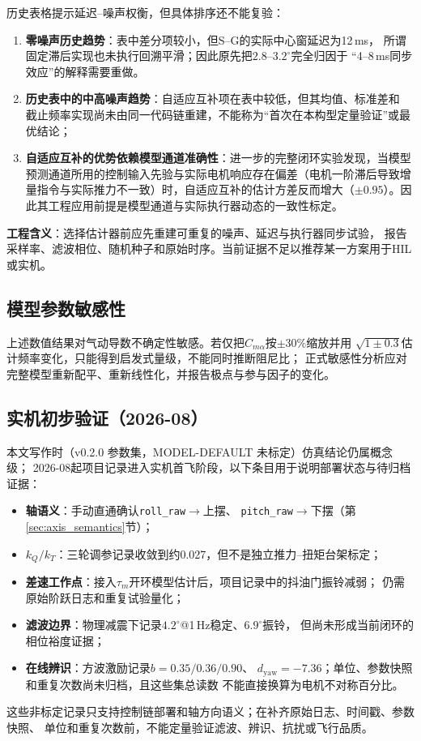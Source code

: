 历史表格提示延迟--噪声权衡，但具体排序还不能复验：

\begin{enumerate}[label=(\arabic*)]
    \item \textbf{零噪声历史趋势}：表中差分项较小，但S--G的实际中心窗延迟为12\,ms，
          所谓固定滞后实现也未执行回溯平滑；因此原先把$2.8$--$3.2^\circ$完全归因于
          “4--8\,ms同步效应”的解释需要重做。
    \item \textbf{历史表中的中高噪声趋势}：自适应互补项在表中较低，但其均值、标准差和
          截止频率实现尚未由同一代码链重建，不能称为“首次在本构型定量验证”或最优结论；
    \item \textbf{自适应互补的优势依赖模型通道准确性}：进一步的完整闭环实验发现，当模型预测通道所用的控制输入先验与实际电机响应存在偏差（电机一阶滞后导致增量指令与实际推力不一致）时，自适应互补的估计方差反而增大（$\pm 0.95$）。因此其工程应用前提是模型通道与实际执行器动态的一致性标定。
\end{enumerate}

\textbf{工程含义}：选择估计器前应先重建可重复的噪声、延迟与执行器同步试验，
报告采样率、滤波相位、随机种子和原始时序。当前证据不足以推荐某一方案用于HIL或实机。

\subsection{模型参数敏感性}

上述数值结果对气动导数不确定性敏感。若仅把$C_{m\alpha}$按$\pm30\%$缩放并用
$\sqrt{1\pm0.3}$估计频率变化，只能得到启发式量级，不能同时推断阻尼比；
正式敏感性分析应对完整模型重新配平、重新线性化，并报告极点与参与因子的变化。

\subsection{实机初步验证（2026-08）}
本文写作时（v0.2.0 参数集，MODEL-DEFAULT 未标定）仿真结论仍属概念级；
2026-08起项目记录进入实机首飞阶段，以下条目用于说明部署状态与待归档证据：
\begin{itemize}
    \item \textbf{轴语义}：手动直通确认\texttt{roll\_raw}$\to$上摆、
          \texttt{pitch\_raw}$\to$下摆（第\ref{sec:axis_semantics}节）；
    \item \textbf{$k_Q/k_T$}：三轮调参记录收敛到约0.027，但不是独立推力--扭矩台架标定；
    \item \textbf{差速工作点}：接入$\tau_m$开环模型估计后，项目记录中的抖油门振铃减弱；
          仍需原始阶跃日志和重复试验量化；
    \item \textbf{滤波边界}：物理减震下记录$4.2^\circ$@1\,Hz稳定、$6.9^\circ$振铃，
          但尚未形成当前闭环的相位裕度证据；
    \item \textbf{在线辨识}：方波激励记录$b=0.35/0.36/0.90$、
          $d_{\text{yaw}}=-7.36$；单位、参数快照和重复次数尚未归档，且这些集总读数
          不能直接换算为电机不对称百分比。
\end{itemize}
这些非标定记录只支持控制链部署和轴方向语义；在补齐原始日志、时间戳、参数快照、
单位和重复次数前，不能定量验证滤波、辨识、抗扰或飞行品质。
